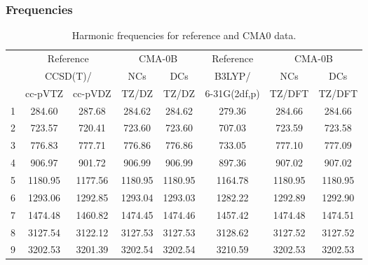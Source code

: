 \documentclass[10pt,oneside]{article}
\begin{document}
\subsubsection*{Frequencies}
\begin{table}[h!]
\centering
\caption{Harmonic frequencies for reference and CMA0 data.}
\begin{tabular}{cccccccc}
\toprule
{} & \multicolumn{2}{c}{Reference} & \multicolumn{2}{c}{CMA-0B} &    Reference & \multicolumn{2}{c}{CMA-0B} \\
{} & \multicolumn{2}{c}{CCSD(T)/} &     NCs &     DCs &       B3LYP/ &     NCs &     DCs \\
{} &   cc-pVTZ & cc-pVDZ &   TZ/DZ &   TZ/DZ & 6-31G(2df,p) &  TZ/DFT &  TZ/DFT \\
\midrule
1 &    284.60 &  287.68 &  284.62 &  284.62 &       279.36 &  284.66 &  284.66 \\
2 &    723.57 &  720.41 &  723.60 &  723.60 &       707.03 &  723.59 &  723.58 \\
3 &    776.83 &  777.71 &  776.86 &  776.86 &       733.05 &  777.10 &  777.09 \\
4 &    906.97 &  901.72 &  906.99 &  906.99 &       897.36 &  907.02 &  907.02 \\
5 &   1180.95 & 1177.56 & 1180.95 & 1180.95 &      1164.78 & 1180.95 & 1180.95 \\
6 &   1293.06 & 1292.85 & 1293.04 & 1293.03 &      1282.22 & 1292.89 & 1292.90 \\
7 &   1474.48 & 1460.82 & 1474.45 & 1474.46 &      1457.42 & 1474.48 & 1474.51 \\
8 &   3127.54 & 3122.12 & 3127.53 & 3127.53 &      3128.62 & 3127.52 & 3127.52 \\
9 &   3202.53 & 3201.39 & 3202.54 & 3202.54 &      3210.59 & 3202.53 & 3202.53 \\
\bottomrule
\end{tabular}
\end{table}

\clearpage
\end{document}

